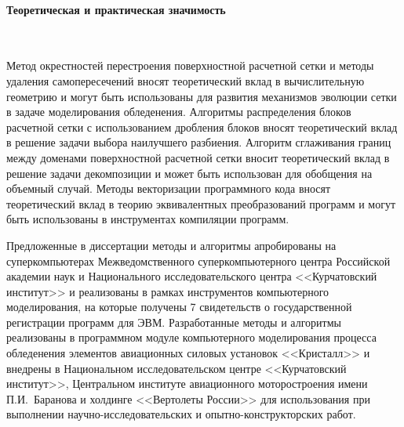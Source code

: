 \paragraph{Теоретическая и практическая значимость} \

Метод окрестностей перестроения поверхностной расчетной сетки и методы удаления самопересечений вносят теоретический вклад в вычислительную геометрию и могут быть использованы для развития механизмов эволюции сетки в задаче моделирования обледенения.
Алгоритмы распределения блоков расчетной сетки с использованием дробления блоков вносят теоретический вклад в решение задачи выбора наилучшего разбиения.
Алгоритм сглаживания границ между доменами поверхностной расчетной сетки вносит теоретический вклад в решение задачи декомпозиции и может быть использован для обобщения на объемный случай.
Методы векторизации программного кода вносят теоретический вклад в теорию эквивалентных преобразований программ и могут быть использованы в инструментах компиляции программ.

Предложенные в диссертации методы и алгоритмы апробированы на суперкомпьютерах Межведомственного суперкомпьютерного центра Российской академии наук и Национального исследовательского центра <<Курчатовский институт>> и реализованы в рамках инструментов компьютерного моделирования, на которые получены 7 свидетельств о государственной регистрации программ для ЭВМ.
Разработанные методы и алгоритмы реализованы в программном модуле компьютерного моделирования процесса обледенения элементов авиационных силовых установок <<Кристалл>> и внедрены в Национальном исследовательском центре <<Курчатовский институт>>, Центральном институте авиационного моторостроения имени П.И.~Баранова и холдинге <<Вертолеты России>> для использования при выполнении научно-исследовательских и опытно-конструкторских работ.
